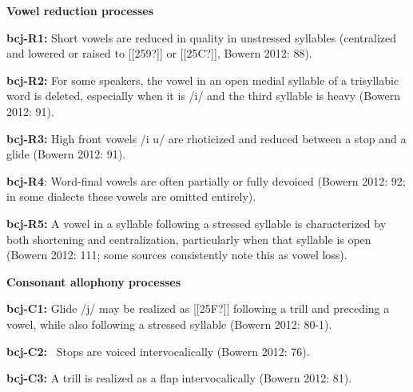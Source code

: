 \begin{styleBody}
\textbf{Vowel reduction processes}
\end{styleBody}

\begin{styleBody}
\textbf{bcj-R1:} Short vowels are reduced in quality in unstressed syllables (centralized and lowered or raised to [[259?]] or [[25C?]], Bowern 2012: 88).
\end{styleBody}

\begin{styleBody}
\textbf{bcj-R2:} For some speakers, the vowel in an open medial syllable of a trisyllabic word is deleted, especially when it is /i/ and the third syllable is heavy (Bowern 2012: 91).
\end{styleBody}

\begin{styleBody}
\textbf{bcj-R3:} High front vowels /i u/ are rhoticized and reduced between a stop and a glide (Bowern 2012: 91).
\end{styleBody}

\begin{styleBody}
\textbf{bcj-R4}: Word-final vowels are often partially or fully devoiced (Bowern 2012: 92; in some dialects these vowels are omitted entirely).
\end{styleBody}

\begin{styleBody}
\textbf{bcj-R5:} A vowel in a syllable following a stressed syllable is characterized by both shortening and centralization, particularly when that syllable is open (Bowern 2012: 111; some sources consistently note this as vowel loss).
\end{styleBody}

\begin{styleBody}
\textbf{Consonant allophony processes}
\end{styleBody}

\begin{styleBody}
\textbf{bcj-C1: }Glide /j/ may be realized as [[25F?]] following a trill and preceding a vowel, while also following a stressed syllable (Bowern 2012: 80-1).
\end{styleBody}

\begin{styleBody}
\textbf{bcj-C2: }\ Stops are voiced intervocalically (Bowern 2012: 76).
\end{styleBody}

\begin{styleBody}
\textbf{bcj-C3: }A trill is realized as a flap intervocalically (Bowern 2012: 81).
\end{styleBody}

